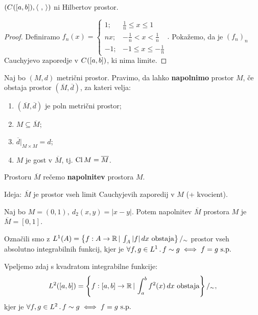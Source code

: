 \begin{trditev}
    \((C^{}([a,b]), \left\langle \ , \,  \right\rangle)\) ni Hilbertov prostor.
\end{trditev}

\begin{proof}
    Definiramo \(f_n(x) = \begin{cases}
        1; &\frac{1}{n} \leq x \leq 1 \\
        nx; &-\frac{1}{n} < x < \frac{1}{n} \\
        -1; &-1 \leq x \leq -\frac{1}{n}
    \end{cases}.\) Pokažemo, da je \((f_n)_n\) Cauchyjevo zaporedje v \(C^{}([a,b])\), ki nima limite.
\end{proof}

\begin{definicija}
    Naj bo \((M, d)\) metrični prostor. Pravimo, da lahko \textbf{napolnimo} prostor \(M\), če obstaja prostor \((\overline{M}, \overline{d})\), za kateri velja:
    \begin{enumerate}
        \item \((\overline{M}, \overline{d})\) je poln metrični prostor;
        \item \(M \subseteq \overline{M}\);
        \item \(\overline{d}|_{M \times M} = d\);
        \item \(M\) je gost v \(\overline{M}\), tj. \(\operatorname{Cl} M = \overline{M}\).
    \end{enumerate}
    Prostoru \(\overline{M}\) rečemo \textbf{napolnitev} prostora \(M\).
\end{definicija}

\begin{opomba}
    Ideja: \(\overline{M}\) je prostor vseh limit Cauchyjevih zaporedij v \(M\) (+ kvocient).
\end{opomba}

\begin{primer}
    Naj bo \(M = (0,1), \ d_2(x,y) = |x-y|\). Potem napolnitev \(\overline{M}\) prostora \(M\) je \(\overline{M} = [0, 1]\).
\end{primer}

\begin{opomba}
    Označili smo z \(L^1(A) = \left\{f: A \to \mathbb{R} \,|\, \int_{A} |f| \, dx \ \text{obstaja}\right\} /_\sim\) prostor vseh absolutno integrabilnih funkcij, kjer je  \(\all{f, g \in L^1} f \sim g \liff f = g \ \text{s.p.}\)
\end{opomba}

Vpeljemo zdaj s kvadratom integrabilne funkcije: 
\[L^2([a, b]) = \left\{f: [a,b] \to \mathbb{R} \,|\, \int_{a}^{b} f^2(x) \, dx \ \text{obstaja}\right\}/_\sim,\]
kjer je \(\all{f, g \in L^2} f \sim g \liff f = g \ \text{s.p.}\)

